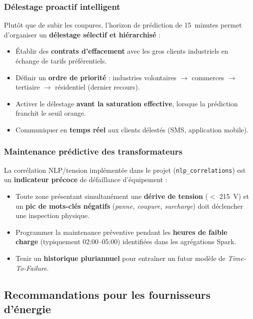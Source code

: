 \documentclass[11pt,a4paper]{article}
\begin{document}
\subsubsection{Délestage proactif intelligent}
Plutôt que de subir les coupures, l'horizon de prédiction de 15~minutes permet d'organiser un \textbf{délestage sélectif et hiérarchisé} :
\begin{itemize}
  \item Établir des \textbf{contrats d'effacement} avec les gros clients industriels en échange de tarifs préférentiels.
  \item Définir un \textbf{ordre de priorité} : industries volontaires $\rightarrow$ commerces $\rightarrow$ tertiaire $\rightarrow$ résidentiel (dernier recours).
  \item Activer le délestage \textbf{avant la saturation effective}, lorsque la prédiction franchit le seuil orange.
  \item Communiquer en \textbf{temps réel} aux clients délestés (SMS, application mobile).
\end{itemize}

\subsubsection{Maintenance prédictive des transformateurs}
La corrélation NLP/tension implémentée dans le projet (\texttt{nlp\_correlations}) est un \textbf{indicateur précoce} de défaillance d'équipement :
\begin{itemize}
  \item Toute zone présentant simultanément une \textbf{dérive de tension} ($<$ 215~V) et un \textbf{pic de mots-clés négatifs} (\emph{panne, coupure, surcharge}) doit déclencher une inspection physique.
  \item Programmer la maintenance préventive pendant les \textbf{heures de faible charge} (typiquement 02:00--05:00) identifiées dans les agrégations Spark.
  \item Tenir un \textbf{historique pluriannuel} pour entraîner un futur modèle de \emph{Time-To-Failure}.
\end{itemize}

\subsection{Recommandations pour les fournisseurs d'énergie}
\end{document}
